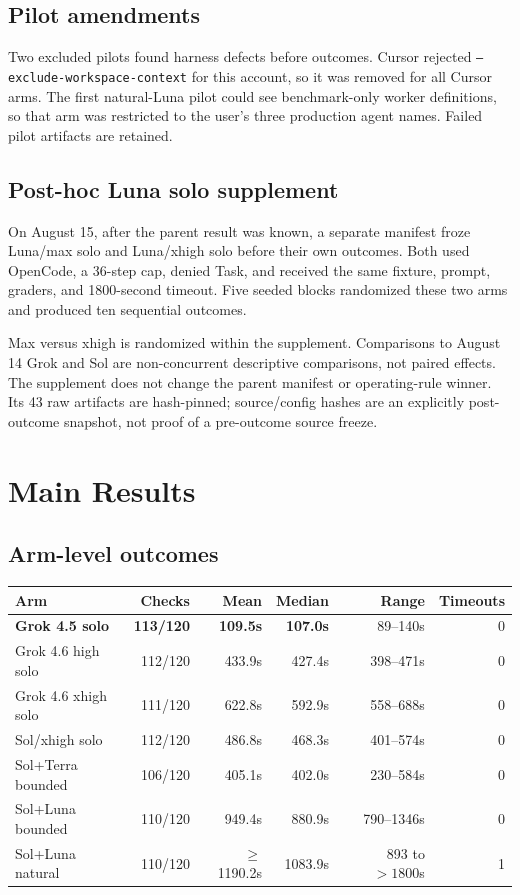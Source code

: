 \documentclass[11pt,oneside]{article}
\begin{document}
\subsection{Pilot amendments}

Two excluded pilots found harness defects before outcomes. Cursor rejected
\texttt{--exclude-workspace-context} for this account, so it was removed for all
Cursor arms. The first natural-Luna pilot could see benchmark-only worker
definitions, so that arm was restricted to the user's three production agent
names. Failed pilot artifacts are retained.

\subsection{Post-hoc Luna solo supplement}

On August 15, after the parent result was known, a separate manifest froze
Luna/max solo and Luna/xhigh solo before their own outcomes. Both used OpenCode,
a 36-step cap, denied Task, and received the same fixture, prompt, graders, and
1800-second timeout. Five seeded blocks randomized these two arms and produced
ten sequential outcomes.

Max versus xhigh is randomized within the supplement. Comparisons to August 14
Grok and Sol are non-concurrent descriptive comparisons, not paired effects.
The supplement does not change the parent manifest or operating-rule winner.
Its 43 raw artifacts are hash-pinned; source/config hashes are an explicitly
post-outcome snapshot, not proof of a pre-outcome source freeze.

\section{Main Results}

\subsection{Arm-level outcomes}

\begin{center}
\small
\begin{tabularx}{\textwidth}{@{}Xrrrrr@{}}
\toprule
Arm & Checks & Mean & Median & Range & Timeouts \\
\midrule
\textbf{Grok 4.5 solo} & \textbf{113/120} & \textbf{109.5s} & \textbf{107.0s} & 89--140s & 0 \\
Grok 4.6 high solo & 112/120 & 433.9s & 427.4s & 398--471s & 0 \\
Grok 4.6 xhigh solo & 111/120 & 622.8s & 592.9s & 558--688s & 0 \\
Sol/xhigh solo & 112/120 & 486.8s & 468.3s & 401--574s & 0 \\
Sol+Terra bounded & 106/120 & 405.1s & 402.0s & 230--584s & 0 \\
Sol+Luna bounded & 110/120 & 949.4s & 880.9s & 790--1346s & 0 \\
Sol+Luna natural & 110/120 & $\geq$1190.2s & 1083.9s & 893 to $>1800$s & 1 \\
\bottomrule
\end{tabularx}
\end{center}
\end{document}
